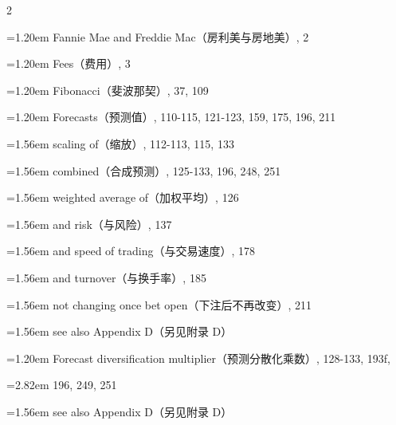 {\begin{multicols}{2}
\par \noindent\hangindent=1.20em\hspace*{0.00em} Fannie Mae and Freddie Mac（房利美与房地美）, 2
\par \noindent\hangindent=1.20em\hspace*{0.00em} Fees（费用）, 3
\par \noindent\hangindent=1.20em\hspace*{0.00em} Fibonacci（斐波那契）, 37, 109
\par \noindent\hangindent=1.20em\hspace*{0.00em} Forecasts（预测值）, 110-115, 121-123, 159, 175, 196, 211
\par \noindent\hangindent=1.56em\hspace*{0.36em} scaling of（缩放）, 112-113, 115, 133
\par \noindent\hangindent=1.56em\hspace*{0.36em} combined（合成预测）, 125-133, 196, 248, 251
\par \noindent\hangindent=1.56em\hspace*{0.36em} weighted average of（加权平均）, 126
\par \noindent\hangindent=1.56em\hspace*{0.36em} and risk（与风险）, 137
\par \noindent\hangindent=1.56em\hspace*{0.36em} and speed of trading（与交易速度）, 178
\par \noindent\hangindent=1.56em\hspace*{0.36em} and turnover（与换手率）, 185
\par \noindent\hangindent=1.56em\hspace*{0.36em} not changing once bet open（下注后不再改变）, 211
\par \noindent\hangindent=1.56em\hspace*{0.36em} see also Appendix D（另见附录 D）
\par \noindent\hangindent=1.20em\hspace*{0.00em} Forecast diversification multiplier（预测分散化乘数）, 128-133, 193f,
\par \noindent\hangindent=2.82em\hspace*{1.62em} 196, 249, 251
\par \noindent\hangindent=1.56em\hspace*{0.36em} see also Appendix D（另见附录 D）

\end{multicols}}

